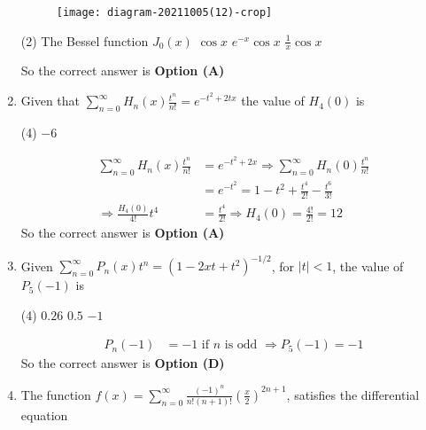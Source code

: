 \begin{enumerate}[label=\color{ocre}\textbf{\arabic*.}]
	{}
	\begin{figure}[H]
		\centering
		\texttt{[image: diagram-20211005(12)-crop]}
	\end{figure}
	\begin{tasks}(2)
		\task[\textbf{A.}]  The Bessel function $J_{0}(x)$
		\task[\textbf{B.}] $\cos x$
		\task[\textbf{C.}] $e^{-x} \cos x$
		\task[\textbf{D.}] $\frac{1}{x} \cos x$
	\end{tasks}
	\begin{answer}
		So the correct answer is \textbf{Option (A)}
	\end{answer}
	\item Given that $\sum_{n=0}^{\infty} H_{n}(x) \frac{t^{n}}{n !}=e^{-t^{2}+2 t x}$ the value of $H_{4}(0)$ is
	{}
	\begin{tasks}(4)
		\task[\textbf{D.}] $-6$
	\end{tasks}
	\begin{answer}
		\begin{align*}
		\sum_{n=0}^{\infty} H_{n}(x) \frac{t^{n}}{n !}&=e^{-t^{2}+2 x} \Rightarrow \sum_{n=0}^{\infty} H_{n}(0) \frac{t^{n}}{n !}\\&=e^{-t^{2}}=1-t^{2}+\frac{t^{4}}{2 !}-\frac{t^{6}}{3 !}\\
		\Rightarrow \frac{H_{4}(0)}{4 !} t^{4}&=\frac{t^{4}}{2 !} \Rightarrow H_{4}(0)=\frac{4 !}{2 !}=12
		\end{align*}
		So the correct answer is \textbf{Option (A)}
	\end{answer}
	\item   Given $\sum_{n=0}^{\infty} P_{n}(x) t^{n}=\left(1-2 x t+t^{2}\right)^{-1 / 2}$, for $|t|<1$, the value of $P_{5}(-1)$ is
	{}
	\begin{tasks}(4)
		\task[\textbf{A.}] $0.26$
		\task[\textbf{C.}] $0.5$
		\task[\textbf{D.}] $-1$
	\end{tasks}
	\begin{answer}
		\begin{align*}
		P_{n}(-1)&=-1\text{ if }n\text{ is odd }\Rightarrow P_{5}(-1)=-1
		\end{align*}
		So the correct answer is \textbf{Option (D)}
	\end{answer}
	\item The function $f(x)=\sum_{n=0}^{\infty} \frac{(-1)^{n}}{n !(n+1) !}\left(\frac{x}{2}\right)^{2 n+1}$, satisfies the differential equation

\end{enumerate}
